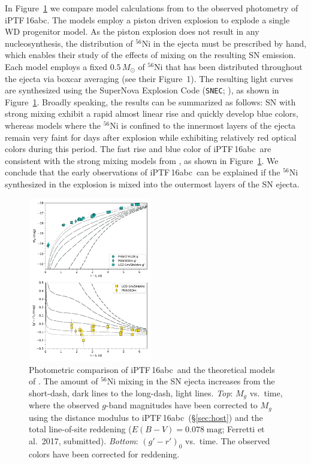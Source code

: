 \documentclass[twocolumn]{aastex61}
\newcommand{\sm}{M_\odot}
\newcommand{\abc}{iPTF\,16abc}
\begin{document}
In Figure~\ref{fig:Ni56LC} we compare model calculations from \citet{2016ApJ...826...96P} to the observed photometry of \abc. The \citeauthor{2016ApJ...826...96P} models employ a piston driven explosion to explode a single WD progenitor model. As the piston explosion does not result in any nucleosynthesis, the distribution of $^{56}$Ni in the ejecta must be prescribed by hand, which enables their study of the effects of mixing on the resulting SN emission. Each model employs a fixed $0.5\,\sm$ of $^{56}$Ni that has been distributed throughout the ejecta via boxcar averaging (see their Figure~1). The resulting light curves are synthesized using the SuperNova Explosion Code (\texttt{SNEC}; \citealt{2015ApJ...814...63M}), as shown in Figure~\ref{fig:Ni56LC}. Broadly speaking, the results can be summarized as follows: SN with strong mixing exhibit a rapid almost linear rise and quickly develop blue colors, whereas models where the $^{56}$Ni is confined to the innermost layers of the ejecta remain very faint for days after explosion while exhibiting relatively red optical colors during this period. The fast rise and blue color of \abc\ are consistent with the strong mixing models from \citet{2016ApJ...826...96P}, as shown in Figure~\ref{fig:Ni56LC}. We conclude that the early observations of \abc\ can be explained if the $^{56}$Ni synthesized in the explosion is mixed into the outermost layers of the SN ejecta. 

\begin{figure}[]
  \centering
  \includegraphics[width=0.48\textwidth]{iPTF16abc_Ni_lc.pdf}
  \caption{Photometric comparison of \abc\ and the theoretical 
  models of \citet{2016ApJ...826...96P}. The amount of $^{56}$Ni 
  mixing in the SN ejecta increases from the short-dash, dark lines 
  to the long-dash, light lines.
  \textit{Top}: $M_g$ vs.\ time, where the observed $g$-band 
  magnitudes  
  have been corrected to $M_g$ using the distance modulus to \abc\ 
  (\S\ref{sec:host})
  and the total line-of-site reddening ($E(B-V) = 0.078 \; 
  \mathrm{mag}$; Ferretti et al.\ 2017, submitted).
  \textit{Bottom}: $(g' - r')_0$ vs.\ time. The observed colors have 
  been corrected for reddening.
  }
  \label{fig:Ni56LC}
\end{figure}
\end{document}
